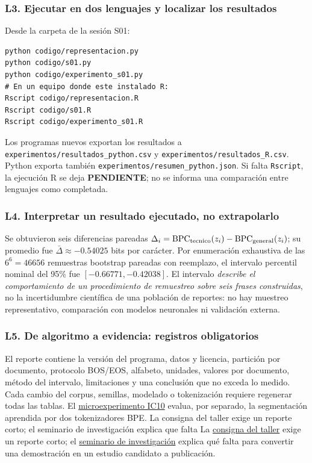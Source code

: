 \subsubsection*{L3. Ejecutar en dos lenguajes y localizar los resultados}
Desde la carpeta de la sesión S01:
\begin{verbatim}
python codigo/representacion.py
python codigo/s01.py
python codigo/experimento_s01.py
# En un equipo donde este instalado R:
Rscript codigo/representacion.R
Rscript codigo/s01.R
Rscript codigo/experimento_s01.R
\end{verbatim}
Los programas nuevos exportan los resultados a
\nolinkurl{experimentos/resultados_python.csv} y
\nolinkurl{experimentos/resultados_R.csv}. Python exporta también
\nolinkurl{experimentos/resumen_python.json}. Si falta \texttt{Rscript},
la ejecución R se deja \textbf{PENDIENTE}; no se informa una comparación
entre lenguajes como completada.

\subsubsection*{L4. Interpretar un resultado ejecutado, no extrapolarlo}
\begin{ejemplo}
Se obtuvieron seis diferencias pareadas
$\Delta_i=\operatorname{BPC}_{\rm tecnico}(z_i)-
\operatorname{BPC}_{\rm general}(z_i)$; su promedio fue
$\bar\Delta\approx-0.54025$ bits por carácter.
Por enumeración exhaustiva de las $6^6=46656$ remuestras bootstrap
pareadas con reemplazo, el intervalo percentil nominal del 95\% fue
$[-0.66771,-0.42038]$.
El intervalo \emph{describe el comportamiento de un procedimiento de
remuestreo sobre seis frases construidas}, no la incertidumbre científica
de una población de reportes: no hay muestreo representativo, comparación
con modelos neuronales ni validación externa.
\end{ejemplo}
\subsubsection*{L5. De algoritmo a evidencia: registros obligatorios}
El reporte contiene la versión del programa, datos y licencia,
partición por documento, protocolo BOS/EOS, alfabeto, unidades,
valores por documento, método del intervalo, limitaciones y
una conclusión que no exceda lo medido. Cada cambio del corpus,
semillas, modelado o tokenización requiere regenerar todas las tablas.
El \hyperref[s01:lab:ic10]{microexperimento IC10} evalua, por separado,
la segmentación aprendida por dos tokenizadores BPE.
\ifdefined\labcompstandalone
La consigna del taller exige un reporte corto; el seminario de
investigación explica que falta
\else
La \hyperref[s01:mod:taller]{consigna del taller} exige un reporte corto;
el \hyperref[s01:mod:invest]{seminario de investigación} explica qué falta
\fi
para convertir una demostración en un estudio candidato a publicación.

